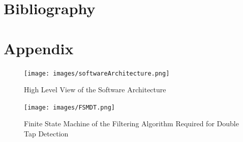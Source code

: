 \documentclass[12pt]{article}
\begin{document}
\newpage
\section{Bibliography}



\newpage
\section{Appendix}
\begin{figure}[!htb]
 \centering
 \texttt{[image: images/softwareArchitecture.png]}
 \caption{High Level View of the Software Architecture}
 \label{fig:softArch}
\end{figure}


\begin{figure}[!htb]
 \centering
 \texttt{[image: images/FSMDT.png]}
 \caption{Finite State Machine of the Filtering Algorithm Required for Double Tap Detection}
 \label{fig:FSMDT}
\end{figure}
\end{document}
